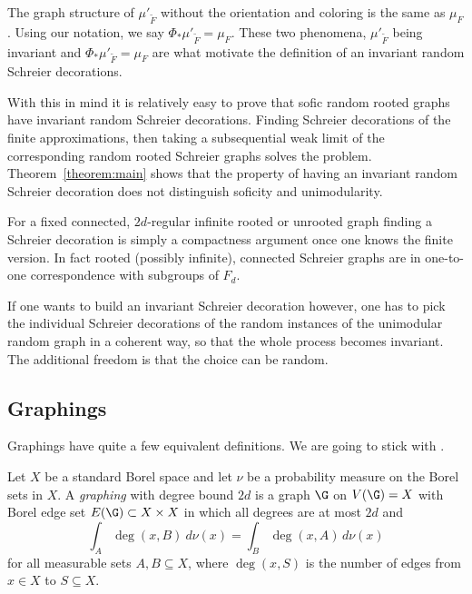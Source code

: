 The graph structure of $\mu'_{\widetilde{F}}$ without the orientation and coloring is the same as $\mu_F$. Using our notation, we say $\Phi_{*} \mu'_{\widetilde{F}} = \mu_F$. These two phenomena, $\mu'_{\widetilde{F}}$ being invariant and $\Phi_{*} \mu'_{\widetilde{F}} = \mu_F$ are what motivate the definition of an invariant random Schreier decorations.

With this in mind it is relatively easy to prove that sofic random rooted graphs have invariant random Schreier decorations. Finding Schreier decorations of the finite approximations, then taking a subsequential weak limit of the corresponding random rooted Schreier graphs solves the problem. Theorem~\ref{theorem:main} shows that the property of having an invariant random Schreier decoration does not distinguish soficity and unimodularity.

\begin{rema*}
For a fixed connected, $2d$-regular infinite rooted or unrooted graph finding a Schreier decoration is simply a compactness argument once one knows the finite version. In fact rooted (possibly infinite), connected Schreier graphs are in one-to-one correspondence with subgroups of $F_d$.

If one wants to build an invariant Schreier decoration however, one has to pick the individual Schreier decorations of the random instances of the unimodular random graph in a coherent way, so that the whole process becomes invariant. The additional freedom is that the choice can be random.
\end{rema*}

\subsection{Graphings}

Graphings have quite a few equivalent definitions. We are going to stick with \cite{lovasz2012large}.

\begin{defi}[Graphing] \label{def:graphing}
Let $X$ be a standard Borel space and let $\nu$ be a probability measure on the Borel sets in $X$. A \emph{graphing} with degree bound $2d$ is a graph $\G$ on $V(\G) = X $ with Borel edge set $E(\G) \subset X \times X$ in which all degrees are at most $2d$ and
\begin{equation}\label{eqn:graphing}
\int_{A} \deg(x,B) \ d \nu (x) = \int_{B} \deg(x,A) \, d \nu (x)
\end{equation}
for all measurable sets $A,B \subseteq X$, where $\deg(x,S)$ is the number of edges from $x \in X$ to $S \subseteq X$.
\end{defi}

